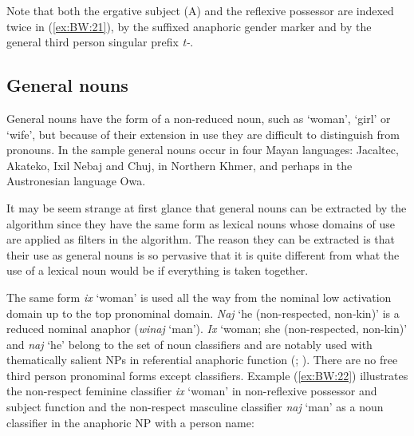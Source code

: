 \documentclass[output=collectionpaper]{langsci/langscibook}
\begin{document}
Note that both the ergative subject (A) and the reflexive possessor are indexed twice in (\ref{ex:BW:21}), by the suffixed anaphoric gender marker and by the general third person singular prefix \textit{t-}.

\subsection{General nouns}
\label{sec:BW:5.4}

General nouns have the form of a non-reduced noun, such as ‘woman’, ‘girl’ or ‘wife’, but because of their extension in use they are difficult to distinguish from pronouns. In the sample general nouns occur in four Mayan languages: Jacaltec, Akateko, Ixil Nebaj and Chuj, in Northern Khmer, and perhaps in the Austronesian language Owa.

It may be seem strange at first glance that general nouns can be extracted by the algorithm since they have the same form as lexical nouns whose domains of use are applied as filters in the algorithm. The reason they can be extracted is that their use as general nouns is so pervasive that it is quite different from what the use of a lexical noun would be if everything is taken together.

The same  form \textit{ix} ‘woman’ is used all the way from the nominal low activation domain up to the top pronominal domain. \textit{Naj} ‘he (non-respected, non-kin)’ is a reduced nominal anaphor (\textit{winaj} ‘man’). \textit{Ix} ‘woman; she (non-respected, non-kin)’ and \textit{naj} ‘he’ belong to the set of noun classifiers and are notably used with thematically salient NPs in referential anaphoric function (\citealt[267]{Craig1986}; \citealt[323]{Aikhenvald2000}). There are no free third person pronominal forms except classifiers. Example (\ref{ex:BW:22}) illustrates the non-respect feminine classifier \textit{ix} ‘woman’ in non-reflexive possessor and subject function and the non-respect masculine classifier \textit{naj} ‘man’ as a noun classifier in the anaphoric NP with a person name:

%
\end{document}
